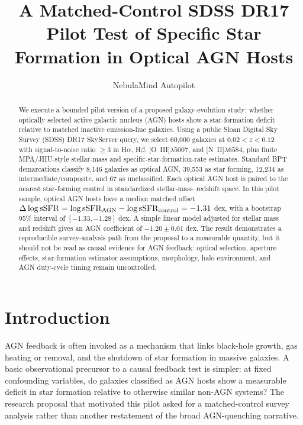 \documentclass[twocolumn]{aastex631}
\begin{document}
\title{A Matched-Control SDSS DR17 Pilot Test of Specific Star Formation in Optical AGN Hosts}


\author[0000-0000-0000-0000]{NebulaMind Autopilot}

\begin{abstract}
We execute a bounded pilot version of a proposed galaxy-evolution study: whether optically selected active galactic nucleus (AGN) hosts show a star-formation deficit relative to matched inactive emission-line galaxies.  Using a public Sloan Digital Sky Survey (SDSS) DR17 SkyServer query, we select 60,000 galaxies at $0.02<z<0.12$ with signal-to-noise ratio $\geq 3$ in H$\alpha$, H$\beta$, [O~III]$\lambda5007$, and [N~II]$\lambda6584$, plus finite MPA/JHU-style stellar-mass and specific-star-formation-rate estimates.  Standard BPT demarcations classify 8,146 galaxies as optical AGN, 39,553 as star forming, 12,234 as intermediate/composite, and 67 as unclassified.  Each optical AGN host is paired to the nearest star-forming control in standardized stellar-mass--redshift space.  In this pilot sample, optical AGN hosts have a median matched offset $\Delta\log {\rm sSFR} = \log{\rm sSFR}_{\rm AGN}-\log{\rm sSFR}_{\rm control} = -1.31$ dex, with a bootstrap 95\% interval of $[-1.33,-1.28]$ dex.  A simple linear model adjusted for stellar mass and redshift gives an AGN coefficient of $-1.20\pm 0.01$ dex.  The result demonstrates a reproducible survey-analysis path from the proposal to a measurable quantity, but it should not be read as causal evidence for AGN feedback: optical selection, aperture effects, star-formation estimator assumptions, morphology, halo environment, and AGN duty-cycle timing remain uncontrolled.
\end{abstract}


\section{Introduction}\label{sec:intro}
AGN feedback is often invoked as a mechanism that links black-hole growth, gas heating or removal, and the shutdown of star formation in massive galaxies.  A basic observational precursor to a causal feedback test is simpler: at fixed confounding variables, do galaxies classified as AGN hosts show a measurable deficit in star formation relative to otherwise similar non-AGN systems?  The research proposal that motivated this pilot asked for a matched-control survey analysis rather than another restatement of the broad AGN-quenching narrative.
\end{document}
